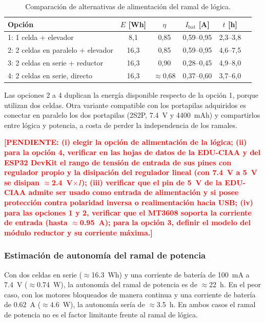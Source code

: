 \documentclass[12pt,a4paper]{article}
\newcommand{\pendiente}[1]{\textcolor{red}{\textbf{[PENDIENTE: #1]}}}
\newcommand{\vr}{\rowcolor{yellow!50}}
\begin{document}
\begin{table}[H]
\centering
\caption{Comparación de alternativas de alimentación del ramal de lógica.}
\label{tab:opciones}
\small
\begin{tabular}{L{3.7cm}ccccc}
\toprule
Opción & $E$ [Wh] & $\eta$ & $I_{\text{bat}}$ [A] & $t$ [h] \\
\midrule
\vr 1: 1 celda + elevador & 8,1 & 0,85 & 0,59--0,95 & 2,3--3,8 \\
\vr 2: 2 celdas en paralelo + elevador & 16,3 & 0,85 & 0,59--0,95 & 4,6--7,5 \\
\vr 3: 2 celdas en serie + reductor & 16,3 & 0,90 & 0,28--0,45 & 4,9--8,0 \\
\vr 4: 2 celdas en serie, directo & 16,3 & $\approx$0,68 & 0,37--0,60 & 3,7--6,0 \\
\bottomrule
\end{tabular}
\end{table}

\begin{visar}
Las opciones 2 a 4 duplican la energía disponible respecto de la opción 1, porque utilizan dos celdas. Otra variante compatible con los portapilas adquiridos es conectar en paralelo los dos portapilas (2S2P, \SI{7,4}{V} y \SI{4400}{mAh}) y compartirlos entre lógica y potencia, a costa de perder la independencia de los ramales.
\end{visar}
\pendiente{(i) elegir la opción de alimentación de la lógica; (ii) para la opción 4, verificar en las hojas de datos de la EDU-CIAA y del ESP32 DevKit el rango de tensión de entrada de sus pines con regulador propio y la disipación del regulador lineal (con \SI{7,4}{V} a \SI{5}{V} se disipan $\approx$\SI{2,4}{V}$\times I$); (iii) verificar que el pin de \SI{5}{V} de la EDU-CIAA admite ser usado como entrada de alimentación y si posee protección contra polaridad inversa o realimentación hacia USB; (iv) para las opciones 1 y 2, verificar que el MT3608 soporta la corriente de entrada (hasta $\approx$\SI{0,95}{A}); para la opción 3, definir el modelo del módulo reductor y su corriente máxima.}

\subsubsection{Estimación de autonomía del ramal de potencia}
\begin{visar}
Con dos celdas en serie ($\approx$\SI{16,3}{Wh}) y una corriente de batería de \SI{100}{mA} a \SI{7,4}{V} ($\approx$\SI{0,74}{W}), la autonomía del ramal de potencia es de $\approx$\SI{22}{h}. En el peor caso, con los motores bloqueados de manera continua y una corriente de batería de \SI{0,62}{A} ($\approx$\SI{4,6}{W}), la autonomía sería de $\approx$\SI{3,5}{h}. En ambos casos el ramal de potencia no es el factor limitante frente al ramal de lógica.
\end{visar}
\end{document}
